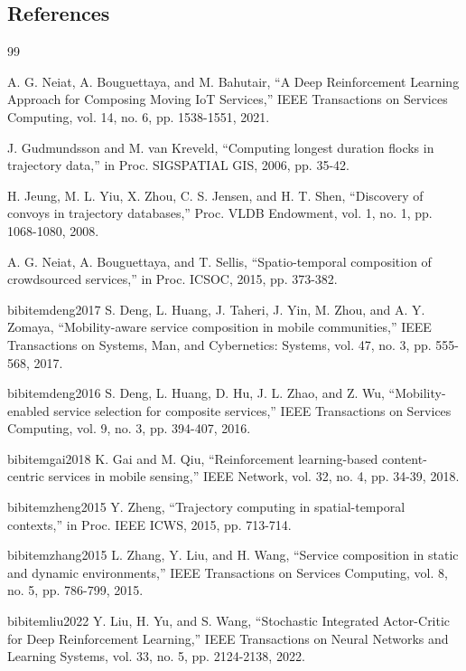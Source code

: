 \subsection{References}\label{references}

\begin{thebibliography}{99}

	 A. G. Neiat, A. Bouguettaya, and M. Bahutair, ``A Deep Reinforcement Learning Approach for Composing Moving IoT Services,'' IEEE Transactions on Services Computing, vol. 14, no. 6, pp. 1538-1551, 2021.

	 J. Gudmundsson and M. van Kreveld, ``Computing longest duration flocks in trajectory data,'' in Proc. SIGSPATIAL GIS, 2006, pp. 35-42.

	 H. Jeung, M. L. Yiu, X. Zhou, C. S. Jensen, and H. T. Shen, ``Discovery of convoys in trajectory databases,'' Proc. VLDB Endowment, vol. 1, no. 1, pp. 1068-1080, 2008.

	 A. G. Neiat, A. Bouguettaya, and T. Sellis, ``Spatio-temporal composition of crowdsourced services,'' in Proc. ICSOC, 2015, pp. 373-382.

	bibitem{deng2017} S. Deng, L. Huang, J. Taheri, J. Yin, M. Zhou, and A. Y. Zomaya, ``Mobility-aware service composition in mobile communities,'' IEEE Transactions on Systems, Man, and Cybernetics: Systems, vol. 47, no. 3, pp. 555-568, 2017.

	bibitem{deng2016} S. Deng, L. Huang, D. Hu, J. L. Zhao, and Z. Wu, ``Mobility-enabled service selection for composite services,'' IEEE Transactions on Services Computing, vol. 9, no. 3, pp. 394-407, 2016.

	bibitem{gai2018} K. Gai and M. Qiu, ``Reinforcement learning-based content-centric services in mobile sensing,'' IEEE Network, vol. 32, no. 4, pp. 34-39, 2018.

	bibitem{zheng2015} Y. Zheng, ``Trajectory computing in spatial-temporal contexts,'' in Proc. IEEE ICWS, 2015, pp. 713-714.

	bibitem{zhang2015} L. Zhang, Y. Liu, and H. Wang, ``Service composition in static and dynamic environments,'' IEEE Transactions on Services Computing, vol. 8, no. 5, pp. 786-799, 2015.

	bibitem{liu2022} Y. Liu, H. Yu, and S. Wang, ``Stochastic Integrated Actor-Critic for Deep Reinforcement Learning,'' IEEE Transactions on Neural Networks and Learning Systems, vol. 33, no. 5, pp. 2124-2138, 2022.


\end{thebibliography}
